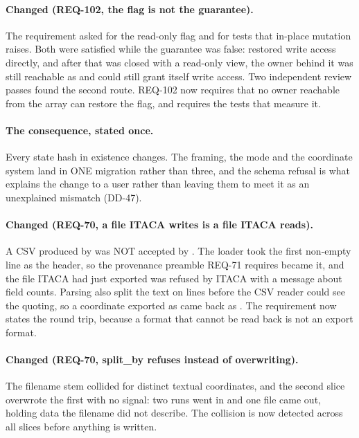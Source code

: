 \paragraph{Changed (REQ-102, the flag is not the guarantee).} The
requirement asked for the read-only flag and for tests that in-place
mutation raises. Both were satisfied while the guarantee was false:
 restored write access directly, and after
that was closed with a read-only view, the owner behind it was still
reachable as  and could still grant itself write
access. Two independent review passes found the second route. REQ-102
now requires that no owner reachable from the array can restore the
flag, and requires the tests that measure it.

\paragraph{The consequence, stated once.} Every state hash in existence
changes. The framing, the mode and the coordinate system land in ONE
migration rather than three, and the schema refusal is what explains
the change to a user rather than leaving them to meet it as an
unexplained mismatch (DD-47).

\paragraph{Changed (REQ-70, a file ITACA writes is a file ITACA
reads).} A CSV produced by  was NOT accepted by
. The loader took the first non-empty line as the
header, so the provenance preamble REQ-71 requires became it, and the
file ITACA had just exported was refused by ITACA with a message about
field counts. Parsing also split the text on lines before the CSV
reader could see the quoting, so a coordinate exported as
 came back as . The
requirement now states the round trip, because a format that cannot be
read back is not an export format.

\paragraph{Changed (REQ-70, split\_by refuses instead of
overwriting).} The filename stem collided for distinct textual
coordinates, and the second slice overwrote the first with no signal:
two runs went in and one file came out, holding data the filename did
not describe. The collision is now detected across all slices before
anything is written.

